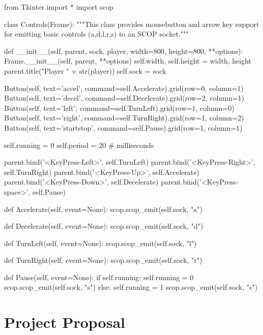 \documentclass[12pt,a4,notitlepage]{report}
\renewcommand{\_}{\texttt{\symbol{95}}}
\newcommand{\<}{\texttt{\symbol{60}}}
\renewcommand{\>}{\texttt{\symbol{62}}}
\begin{document}
\begin{code}
from Tkinter import *
import scop

class Controls(Frame):
    """This class provides mousebutton and arrow key support for emitting basic controls (a,d,l,r,s) to an SCOP socket."""

    def __init__(self, parent, sock, player, width=800, height=800, **options):
        Frame.__init__(self, parent, **options)
        self.width, self.height = width, height
        parent.title("Player " + str(player))
        self.sock = sock     
        
        Button(self, text='accel', command=self.Accelerate).grid(row=0, column=1)
        Button(self, text='decel', command=self.Decelerate).grid(row=2, column=1)
        Button(self, text='left', command=self.TurnLeft).grid(row=1, column=0)
        Button(self, text='right', command=self.TurnRight).grid(row=1, column=2)
        Button(self, text='startstop', command=self.Pause).grid(row=1, column=1)

        self.running = 0
        self.period = 20 # milliseconds

        parent.bind('<KeyPress-Left>', self.TurnLeft)
        parent.bind('<KeyPress-Right>', self.TurnRight)
        parent.bind('<KeyPress-Up>', self.Accelerate)
        parent.bind('<KeyPress-Down>', self.Decelerate)
        parent.bind('<KeyPress-space>', self.Pause)

    def Accelerate(self, event=None):
        scop.scop_emit(self.sock, "a")

    def Decelerate(self, event=None):
        scop.scop_emit(self.sock, "d")

    def TurnLeft(self, event=None):
        scop.scop_emit(self.sock, "l")

    def TurnRight(self, event=None):
        scop.scop_emit(self.sock, "r")
        
    def Pause(self, event=None):
	if self.running:
	    self.running = 0
	    scop.scop_emit(self.sock, "s")
	else:
	    self.running = 1
	    scop.scop_emit(self.sock, "s")
\end{code}

\cleardoublepage

\chapter{Project Proposal}



%
\end{document}
